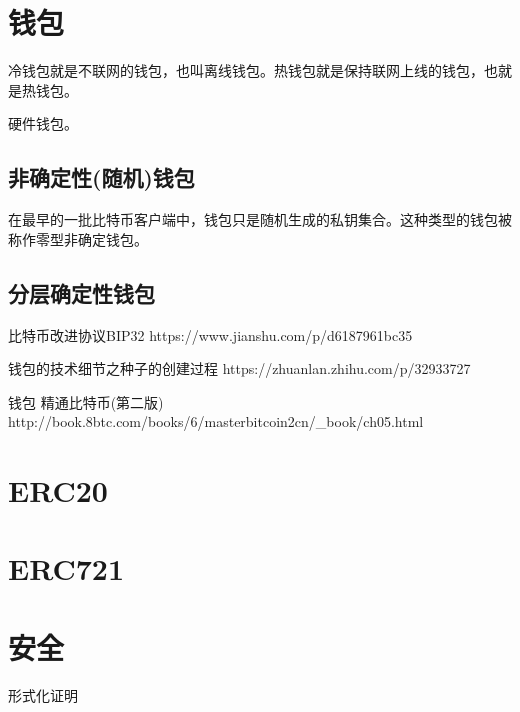 \documentclass[UTF8]{ctexart}
\begin{document}
\section{钱包}

冷钱包就是不联网的钱包，也叫离线钱包。热钱包就是保持联网上线的钱包，也就是热钱包。

硬件钱包。

\subsection{非确定性(随机)钱包}

在最早的一批比特币客户端中，钱包只是随机生成的私钥集合。这种类型的钱包被称作零型非确定钱包。

\subsection{分层确定性钱包}

比特币改进协议BIP32 https://www.jianshu.com/p/d6187961bc35

钱包的技术细节之种子的创建过程 https://zhuanlan.zhihu.com/p/32933727

钱包 精通比特币(第二版) http://book.8btc.com/books/6/masterbitcoin2cn/\_book/ch05.html

\section{ERC20}

\section{ERC721}

\section{安全}
形式化证明

\ifx\allfiles\undefined
\end{document}
